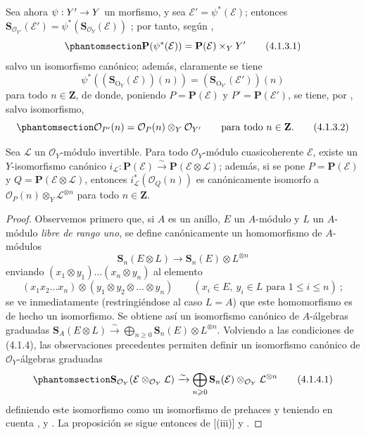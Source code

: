 \documentclass[oneside,10pt]{amsart}
\makeatletter
\renewcommand{\leq}{\leqslant}
\renewcommand{\geq}{\geqslant}
\newcommand{\ega@arrow}[2]{\mathchoice{#1}{#2}{#2}{#2}}
\renewcommand{\to}{\ega@arrow{\longrightarrow}{\rightarrow}}
\newcommand{\oldpage}[2][]{\marginnote{\normalfont\footnotesize\textbf{#1}~|~#2}\ignorespaces}
\let\EGAOriginalLabel\label
\renewcommand{\label}[1]{\phantomsection\EGAOriginalLabel{#1}}
\makeatother
\begin{document}
\begin{env}[4.1.3]
\label{II.4.1.3-fr}
Sea ahora $\psi:Y'\to Y$ un morfismo, y sea $\mathcal{E}'=\psi^*(\mathcal{E})$;
entonces $\mathbf{S}_{\mathcal{O}_{Y'}}(\mathcal{E}')=
\psi^*(\mathbf{S}_{\mathcal{O}_Y}(\mathcal{E}))$ ;
por tanto, según ,
\[
\label{II.4.1.3.1-fr}
  \mathbf{P}(\psi^*(\mathcal{E}))=
  \mathbf{P}(\mathcal{E})\times_YY'
\tag{4.1.3.1}
\]
salvo un isomorfismo canónico;
además, claramente se tiene
\[
  \psi^*((\mathbf{S}_{\mathrm{O}_Y}(\mathcal{E}))(n))
  =(\mathbf{S}_{\mathrm{O}_{Y'}}(\mathcal{E}'))(n)
\]
para todo $n\in\mathbf{Z}$, de donde, poniendo $P=\mathbf{P}(\mathcal{E})$ y $P'=\mathbf{P}(\mathcal{E}')$, se tiene, por , salvo isomorfismo,
\[
\label{II.4.1.3.2-fr}
  \mathcal{O}_{P'}(n)=\mathcal{O}_P(n)\otimes_Y\mathcal{O}_{Y'}
  \qquad\text{para todo }n\in\mathbf{Z}.
\tag{4.1.3.2}
\]
\end{env}

\oldpage[II]{72}
\begin{proposition}[4.1.4]
\label{II.4.1.4-fr}
Sea $\mathcal{L}$ un $\mathcal{O}_Y$-módulo invertible.
Para todo $\mathcal{O}_Y$-módulo cuasicoherente $\mathcal{E}$, existe un $Y$-isomorfismo canónico $i_{\mathcal{L}}:\mathbf{P}(\mathcal{E})\xrightarrow{\sim}
\mathbf{P}(\mathcal{E}\otimes\mathcal{L})$;
además, si se pone $P=\mathbf{P}(\mathcal{E})$ y $Q=\mathbf{P}(\mathcal{E}\otimes\mathcal{L})$, entonces $i_{\mathcal{L}}^*(\mathcal{O}_Q(n))$ es canónicamente isomorfo a $\mathcal{O}_P(n)\otimes_Y\mathcal{L}^{\otimes n}$ para todo $n\in\mathbf{Z}$.
\end{proposition}

\begin{proof}
Observemos primero que, si $A$ es un anillo, $E$ un $A$-módulo y $L$ un $A$-módulo \emph{libre de rango uno}, se define canónicamente un homomorfismo de $A$-módulos
\[
  \mathbf{S}_n(E\otimes L)\longrightarrow
  \mathbf{S}_n(E)\otimes L^{\otimes n}
\]
enviando $(x_1\otimes y_1)\ldots(x_n\otimes y_n)$ al elemento
\[
  (x_1x_2\ldots x_n)\otimes(y_1\otimes y_2\otimes\ldots\otimes y_n)
  \qquad(x_i\in E,\ y_i\in L\text{ para }1\leq i\leq n)~;
\]
se ve inmediatamente (restringiéndose al caso $L=A$) que este homomorfismo es de hecho un isomorfismo.
Se obtiene así un isomorfismo canónico de $A$-álgebras graduadas $\mathbf{S}_A(E\otimes L)\xrightarrow{\sim}
\bigoplus_{n\geq0}\mathbf{S}_n(E)\otimes L^{\otimes n}$.
Volviendo a las condiciones de (4.1.4), las observaciones precedentes permiten definir un isomorfismo canónico de $\mathcal{O}_Y$-álgebras graduadas
\[
\label{II.4.1.4.1-fr}
  \mathbf{S}_{\mathcal{O}_Y}(\mathcal{E}\otimes_{\mathcal{O}_Y}\mathcal{L})
  \xrightarrow{\sim}
  \bigoplus_{n\geq0}\mathbf{S}_n(\mathcal{E})
  \otimes_{\mathcal{O}_Y}\mathcal{L}^{\otimes n}
\tag{4.1.4.1}
\]
definiendo este isomorfismo como un isomorfismo de prehaces y teniendo en cuenta ,  y .
La proposición se sigue entonces de [(iii)] y .
\end{proof}
\end{document}

